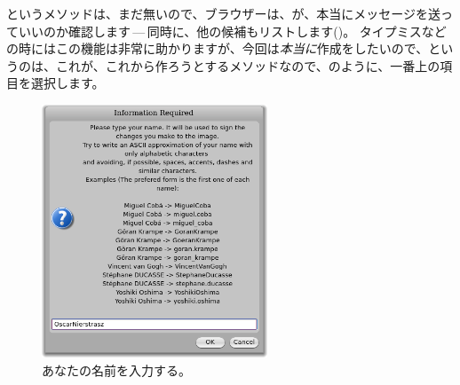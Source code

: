 \documentclass[a4paper,10pt,twoside]{book}
\begin{document}

というメソッドは、まだ無いので、ブラウザーは、が、本当にメッセージを送っていいのか確認します\,---\,同時に、他の候補もリストします()。
タイプミスなどの時にはこの機能は非常に助かりますが、今回は\emph{本当に}作成をしたいので、というのは、これが、これから作ろうとするメソッドなので、のように、一番上の項目を選択します。



\begin{figure}[htb]
\centerline {\includegraphics[width=0.6\textwidth]{name}}
\caption{あなたの名前を入力する。}
\end{figure}
\end{document}
